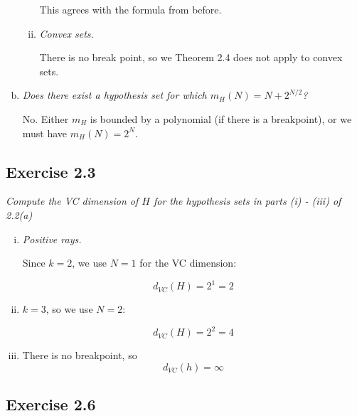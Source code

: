 \documentclass{article}
\begin{document}
\begin{enumerate}[(a)]
\begin{enumerate}[(i)]
        This agrees with the formula from before.

      \item \textit{Convex sets.}

        There is no break point, so we Theorem 2.4 does not apply to convex sets.

    \end{enumerate}

  \item \textit{Does there exist a hypothesis set for which $m_H(N) = N + 2^{N/2}$?}

    No. Either $m_H$ is bounded by a polynomial (if there is a breakpoint), or we must have
    $m_H(N) = 2^N$.

\end{enumerate}


\subsection*{Exercise 2.3}

\textit{Compute the VC dimension of $H$ for the hypothesis sets in parts (i) - (iii) of 2.2(a)}

\begin{enumerate}[(i)]
  \item \textit{Positive rays.}

    Since $k = 2$, we use $N = 1$ for the VC dimension:

    $$d_{VC}(H) = 2^1 = 2$$

  \item

    $k = 3$, so we use $N = 2$:

    $$d_{VC}(H) = 2^2 = 4$$

  \item

    There is no breakpoint, so $$d_{VC}(h) = \infty$$

\end{enumerate}


\subsection*{Exercise 2.6}

\textit{}
\end{document}
